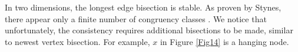 
In two dimensions, the longest edge bisection is stable. As proven by Stynes, there appear only a finite number of congruency classes \cite{stynes1979n,stynes1979faster,stynes1980faster}. We notice that unfortunately, the consistency requires additional bisections to be made, similar to newest vertex bisection. For example, $x$ in Figure \ref{Fig14} is a hanging node.



